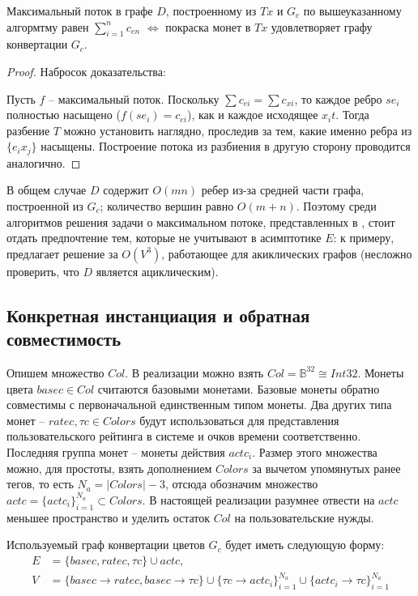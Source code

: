 \documentclass[specification,annotation]{itmo-student-thesis}
\begin{document}
\begin{lemma}
  Максимальный поток в графе $D$, построенному из $Tx$ и $G_c$ по
  вышеуказанному алгормтму равен $\sum_{i=1}^n{c_{en}}$
  $\Leftrightarrow$ покраска монет в $Tx$ удовлетворяет графу
  конвертации $G_c$.
\end{lemma}
\begin{proof}
  Набросок доказательства:

  Пусть $f$ -- максимальный поток. Поскольку $\sum{c_{ei}} =
  \sum{c_{xi}}$, то каждое ребро $se_i$ полностью насыщено ($f(se_i) =
  c_{ei}$), как и каждое исходящее $x_it$. Тогда разбение $T$ можно
  установить наглядно, проследив за тем, какие именно ребра из
  $\{e_ix_j\}$ насыщены. Построение потока из разбиения в другую
  сторону проводится аналогично.
\end{proof}

В общем случае $D$ содержит $O(mn)$ ребер из-за средней части графа,
построенной из $G_c$; количество вершин равно $O(m+n)$. Поэтому среди
алгоритмов решения задачи о максимальном потоке, представленных в
\cite{goldberg1988new}, стоит отдать предпочтение тем, которые не
учитывают в асимптотике $E$: к примеру, \cite{malhotra1978v}
предлагает решение за $O(V^3)$, работающее для акиклических графов
(несложно проверить, что $D$ является ациклическим).

\subsection{Конкретная инстанциация и обратная совместимость}

Опишем множество $Col$. В реализации можно взять $Col =
\mathbb{B}^{32} \cong Int32$. Монеты цвета $basec \in Col$ считаются
базовыми монетами. Базовые монеты обратно совместимы с первоначальной
единственным типом монеты. Два других типа монет -- $ratec, \tau c \in
Colors$ будут использоваться для представления пользовательского
рейтинга в системе и очков времени соответственно. Последняя группа
монет -- монеты действия $actc_i$. Размер этого множества можно, для
простоты, взять дополнением $Colors$ за вычетом упомянутых ранее
тегов, то есть $N_a = |Colors|-3$, отсюда обозначим множество $actc =
\{actc_i\}_{i=1}^{N_a} \subset Colors$. В настоящей реализации
разумнее отвести на $actc$ меньшее пространство и уделить остаток
$Col$ на пользовательские нужды.

Используемый граф конвертации цветов $G_c$ будет иметь следующую
форму:
\begin{align*}
  E &= \{basec, ratec, \tau c\} \cup actc,\\
  V &= \{basec \rightarrow ratec
  , basec \rightarrow \tau c\} \cup
  \{\tau c \rightarrow actc_i\}_{i=1}^{N_a} \cup
  \{actc_i \rightarrow \tau c\}_{i=1}^{N_a}
\end{align*}
\end{document}
